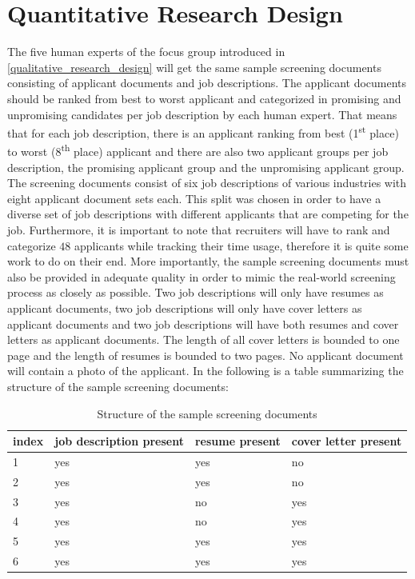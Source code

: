 \documentclass[draft,final]{thesisclass} %
\begin{document}
\section{Quantitative Research Design} \label{quantitative_research_design}
The five human experts of the focus group introduced in \ref{qualitative_research_design} will get the same sample screening documents consisting of applicant documents and job descriptions.
The applicant documents should be ranked from best to worst applicant and categorized in promising and unpromising candidates per job description by each human expert.
That means that for each job description, there is an applicant ranking from best (1\textsuperscript{st} place) to worst (8\textsuperscript{th} place) applicant and there are also two applicant groups per job description, the promising applicant group and the unpromising applicant group.
The screening documents consist of six job descriptions of various industries with eight applicant document sets each.
This split was chosen in order to have a diverse set of job descriptions with different applicants that are competing for the job.
Furthermore, it is important to note that recruiters will have to rank and categorize $48$ applicants while tracking their time usage, therefore it is quite some work to do on their end.
More importantly, the sample screening documents must also be provided in adequate quality in order to mimic the real-world screening process as closely as possible.
Two job descriptions will only have resumes as applicant documents, two job descriptions will only have cover letters as applicant documents and two job descriptions will have both resumes and cover letters as applicant documents.
The length of all cover letters is bounded to one page and the length of resumes is bounded to two pages.
No applicant document will contain a photo of the applicant.
In the following is a table summarizing the structure of the sample screening documents:
\begin{table}[H]
    \begin{tabular}{|l|l|l|l|}
    \hline
    \textbf{index} & \textbf{job description present} & \textbf{resume present} & \textbf{cover letter present} \\ \hline
    1 & yes & yes & no  \\ \hline
    2 & yes & yes & no  \\ \hline
    3 & yes & no  & yes \\ \hline
    4 & yes & no  & yes \\ \hline
    5 & yes & yes & yes \\ \hline
    6 & yes & yes & yes \\ \hline
    \end{tabular}
    \caption{Structure of the sample screening documents}
\end{table}
\end{document}
